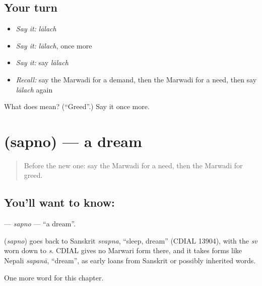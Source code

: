 \subsection*{Your turn}
\begin{itemize}
\raggedright
  \item \emph{Say it:} \emph{lālach}
  \item \emph{Say it:} \emph{lālach}, once more
  \item \emph{Say it:} say \emph{lālach}
  \item \emph{Recall:} say the Marwadi for a demand, then the Marwadi for a need, then say \emph{lālach} again
\end{itemize}

\begin{tcolorbox}[breakable,colback=teal!4,colframe=teal!35!black,title={Before you move on}]
What does  mean? (\textquotedblleft{}Greed\textquotedblright{}.) Say it once more.
\end{tcolorbox}
\section[\texorpdfstring{\mw{सपनो} (sapno)}{सपनो (sapno)}]{ (sapno) — a dream}

\label{lesson:MW-C112-sapno}



\begin{quote}
Before the new one: say the Marwadi for a need, then the Marwadi for greed.
\end{quote}

\subsection*{You'll want to know: }
\textbf{} — \emph{sapno} — \textquotedblleft{}a dream\textquotedblright{}.

\begin{cousinweb}
\textbf{} (\emph{sapno}) goes back to Sanskrit \emph{svapna}, \textquotedblleft{}sleep, dream\textquotedblright{} (CDIAL 13904), with the \emph{sv} worn down to \emph{s}. CDIAL gives no Marwari form there, and it takes forms like Nepali \emph{sapanā}, \textquotedblleft{}dream\textquotedblright{}, as early loans from Sanskrit or possibly inherited words.
\end{cousinweb}

\begin{grammarlens}[title={What you've built}]
One more word for this chapter.
\end{grammarlens}

